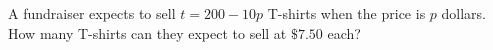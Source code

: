 A fundraiser expects to sell $t=200-10p$ T-shirts when the price is $p$ dollars. How many T-shirts can they expect to sell at $\$7.50$ each?
